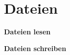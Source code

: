 \section*{Dateien}
\begin{minipage}[h]{9cm}
	\bfseries{Dateien lesen}
	\\
	
\end{minipage}
\begin{minipage}[h]{9cm}
	\bfseries{Dateien schreiben}
	
\end{minipage}
\newpage